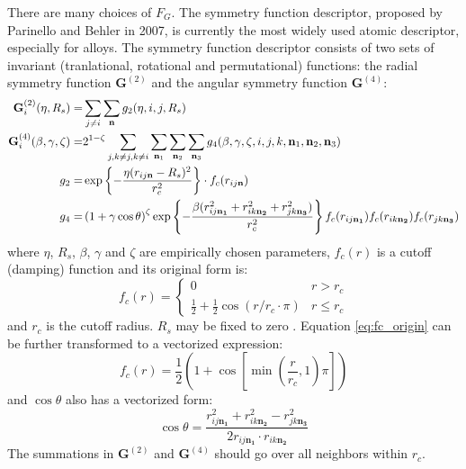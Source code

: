 \documentclass[preprint]{revtex4-2}
\begin{document}
\newcommand{\rijna}{r_{ij\mathbf{n_1}}}
\newcommand{\rikna}{r_{ik\mathbf{n_2}}}
\newcommand{\rjkna}{r_{jk\mathbf{n_3}}}

There are many choices of $F_G$. The symmetry function descriptor, proposed 
by Parinello and Behler in 2007\cite{Behler}, is currently the most widely used 
atomic descriptor, especially for alloys. The symmetry function descriptor 
consists of two sets of invariant (tranlational, rotational and permutational) 
functions: the radial symmetry function $\mathbf{G}^{(2)}$ and the angular 
symmetry function $\mathbf{G}^{(4)}$:
\begin{align}
\label{eq:G2}
\mathbf{G}^{(2)}_i(\eta, R_s) = & \sum_{j \neq i}{
    \sum_{\mathbf{n}}{g_2 (\eta, i, j, R_s)}
} \\
\label{eq:G4}
\mathbf{G}^{(4)}_i(\beta, \gamma, \zeta) 
= & 2^{1-\zeta}\sum_{j, k\neq j, k\neq i}{
    \sum_{\mathbf{n}_1}{\sum_{\mathbf{n}_2}{\sum_{\mathbf{n}_3}{
        g_4(\beta, \gamma, \zeta, 
          i, j, k, 
          \mathbf{n}_1, \mathbf{n}_2, \mathbf{n}_3)
    }}}
} \\
\label{eq:g2}
g_2 = & \exp\left\{-\frac{\eta(\rijn - R_s)^2}{r_c^2} \right\}
\cdot f_c(\rijn) \\
g_4 = & \left( 1 + \gamma\cos\theta \right)^\zeta 
    \exp \left\{ -\frac{\beta(\rijna^2 + \rikna^2 + \rjkna^2)}{r_c^2} \right\}
f_c(\rijna)f_c(\rikna)f_c(\rjkna)
\end{align}
where $\eta$, $R_s$, $\beta$, $\gamma$ and $\zeta$ are empirically chosen 
parameters, $f_c(r)$ is a cutoff (damping) function and its original form is:
\begin{equation}
\label{eq:fc_origin}
f_c(r) =
    \begin{cases}
    0 & \text{$r > r_c$} \\
    \frac{1}{2} + \frac{1}{2}\cos\left(r / r_c \cdot \pi \right) & 
    \text{$r \leq r_c$}
    \end{cases}
\end{equation}
and $r_c$ is the cutoff radius. $R_s$ may be fixed to zero \cite{AMP}. 
Equation \eqref{eq:fc_origin} can be further transformed to a vectorized 
expression:
\begin{equation}
\label{eq:fc}
f_c(r) = \frac{1}{2}\left( 
    1 + \cos\left[ \min(\frac{r}{r_c}, 1) \pi \right] 
\right)
\end{equation} 
and $\cos\theta$ also has a vectorized form:
\begin{equation}
\cos\theta = \frac{\rijna^2 + \rikna^2 - \rjkna^2}{2 \rijna \cdot \rikna}
\end{equation}
The summations in $\mathbf{G}^{(2)}$ and $\mathbf{G}^{(4)}$ should go over all 
neighbors within $r_c$. 
\end{document}
